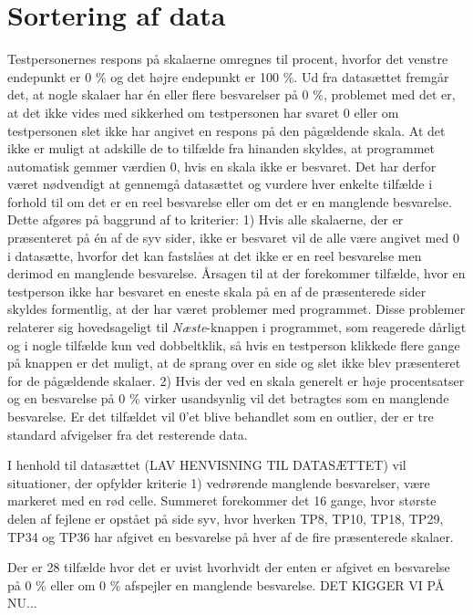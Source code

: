 \section{Sortering af data}
\label{TestAfSkalaSorteringAfData}
%
%
Testpersonernes respons på skalaerne omregnes til procent, hvorfor det venstre endepunkt er 0 \% og det højre endepunkt er 100 \%. Ud fra datasættet fremgår det, at nogle skalaer har én eller flere besvarelser på 0 \%, problemet med det er, at det ikke vides med sikkerhed om testpersonen har svaret 0 eller om testpersonen slet ikke har angivet en respons på den pågældende skala. At det ikke er muligt at adskille de to tilfælde fra hinanden skyldes, at programmet automatisk gemmer værdien 0, hvis en skala ikke er besvaret. Det har derfor været nødvendigt at gennemgå datasættet og vurdere hver enkelte tilfælde i forhold til om det er en reel besvarelse eller om det er en manglende besvarelse. Dette afgøres på baggrund af to kriterier: 1) Hvis alle skalaerne, der er præsenteret på én af de syv sider, ikke er besvaret vil de alle være angivet med 0 i datasætte, hvorfor det kan fastslåes at det ikke er en reel besvarelse men derimod en manglende besvarelse. Årsagen til at der forekommer tilfælde, hvor en testperson ikke har besvaret en eneste skala på en af de præsenterede sider skyldes formentlig, at der har været problemer med programmet. Disse problemer relaterer sig hovedsageligt til \textit{Næste}-knappen i programmet, som reagerede dårligt og i nogle tilfælde kun ved dobbeltklik, så hvis en testperson klikkede flere gange på knappen er det muligt, at de sprang over en side og slet ikke blev præsenteret for de pågældende skalaer. 2) Hvis der ved en skala generelt er høje procentsatser og en besvarelse på 0 \% virker usandsynlig vil det betragtes som en manglende besvarelse. Er det tilfældet vil 0'et blive behandlet som en outlier, der er tre standard afvigelser fra det resterende data.

I henhold til datasættet (LAV HENVISNING TIL DATASÆTTET) vil situationer, der opfylder kriterie 1) vedrørende manglende besvarelser, være markeret med en rød celle. Summeret forekommer det 16 gange, hvor største delen af fejlene er opstået på side syv, hvor hverken TP8, TP10, TP18, TP29, TP34 og TP36 har afgivet en besvarelse på hver af de fire præsenterede skalaer. 

Der er 28 tilfælde hvor det er uvist hvorhvidt der enten er afgivet en besvarelse på 0 \% eller om 0 \% afspejler en manglende besvarelse. DET KIGGER VI PÅ NU... 

